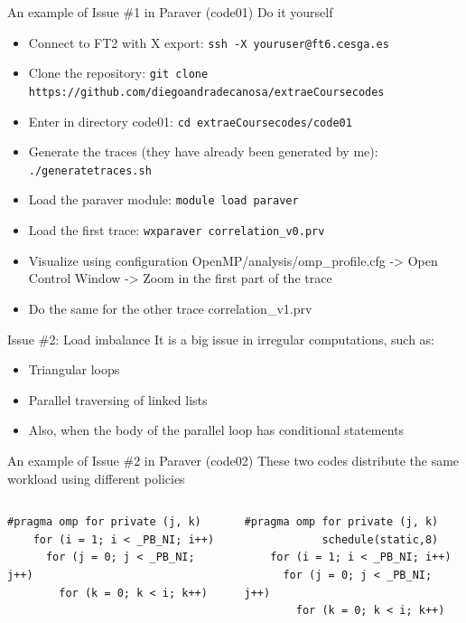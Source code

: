 \documentclass[10pt,xcolor=table]{beamer}
\begin{document}
\begin{frame}{An example of Issue \#1 in Paraver (code01)}
Do it yourself
\begin{itemize}
    \item Connect to FT2 with X export: {\tt ssh -X youruser@ft6.cesga.es}
    \item Clone the repository: {\tt git clone https://github.com/diegoandradecanosa/extraeCoursecodes}
    \item Enter in directory code01: {\tt cd extraeCoursecodes/code01}
    \item Generate the traces (they have already been generated by me): {\tt ./generatetraces.sh}
    \item Load the paraver module:  {\tt module load paraver}
    \item Load the first trace: {\tt wxparaver correlation\_v0.prv}
    \item Visualize using configuration OpenMP/analysis/omp\_profile.cfg -> Open Control Window -> Zoom in the first part of the trace
    \item Do the same for the other trace correlation\_v1.prv
\end{itemize}
\end{frame}

\begin{frame}{Issue \#2: Load imbalance}
It is a big issue in irregular computations, such as:
\begin{itemize}
    \item Triangular loops
    \item Parallel traversing of linked lists
    \item Also, when the body of the parallel loop has conditional statements
\end{itemize}
\end{frame}

\begin{frame}[fragile]{An example of Issue \#2 in Paraver (code02)}
These two codes distribute the same workload using different policies
\begin{columns}
\begin{column}{0.5\textwidth}
\begin{lstlisting}[style=shell,basicstyle=\scriptsize\ttfamily,gobble=3,caption={Default scheduling}]
    #pragma omp for private (j, k)
    for (i = 1; i < _PB_NI; i++)
      for (j = 0; j < _PB_NI; j++)
        for (k = 0; k < i; k++)
  \end{lstlisting}
  \end{column}
\begin{column}{0.5\textwidth}
  \begin{lstlisting}[style=shell,gobble=3,basicstyle=\scriptsize\ttfamily,caption={Load-balance-aware scheduling}]
    #pragma omp for private (j, k) 
            schedule(static,8)
    for (i = 1; i < _PB_NI; i++)
      for (j = 0; j < _PB_NI; j++)
	    for (k = 0; k < i; k++)
  \end{lstlisting}
  \end{column}
  \end{columns}
\end{frame}
\end{document}
